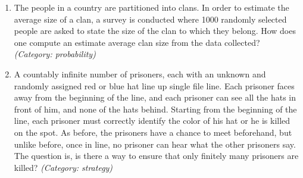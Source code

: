 \begin{enumerate}

\item The people in a country are partitioned into clans.  In order to estimate the average size of a clan, a survey is conducted where 1000 randomly selected people are asked to state the size of the clan to which they belong.  How does one compute an estimate average clan size from the data collected?
\small\emph{(Category: probability)}




\item A countably infinite number of prisoners, each with an unknown and randomly assigned red or blue hat line up single file line. Each prisoner faces away from the beginning of the line, and each prisoner can see all the hats in front of him, and none of the hats behind. Starting from the beginning of the line, each prisoner must correctly identify the color of his hat or he is killed on the spot. As before, the prisoners have a chance to meet beforehand, but unlike before, once in line, no prisoner can hear what the other prisoners say. The question is, is there a way to ensure that only finitely many prisoners are killed?
\small\emph{(Category: strategy)}



\end{enumerate}
\newpage
